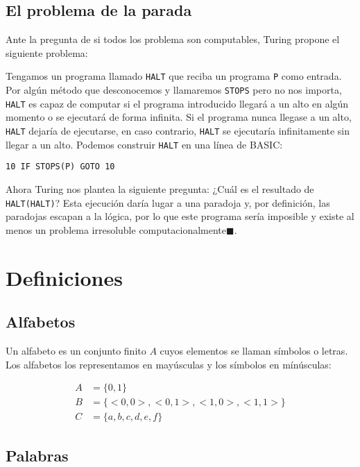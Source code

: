 \subsection{El problema de la parada}

Ante la pregunta de si todos los problema son computables, Turing propone el siguiente problema:

Tengamos un programa llamado \texttt{HALT} que reciba un programa \texttt{P} como entrada.
Por algún método que desconocemos y llamaremos \texttt{STOPS} pero no nos importa, \texttt{HALT} es capaz de computar si el programa introducido llegará a un alto en algún momento o se ejecutará de forma infinita.
Si el programa nunca llegase a un alto, \texttt{HALT} dejaría de ejecutarse, en caso contrario, \texttt{HALT} se ejecutaría infinitamente sin llegar a un alto.
Podemos construir \texttt{HALT} en una línea de BASIC\@:

\begin{lstlisting}[language={[Visual]Basic}]
10 IF STOPS(P) GOTO 10
\end{lstlisting}

Ahora Turing nos plantea la siguiente pregunta:
¿Cuál es el resultado de \texttt{HALT(HALT)}?
Esta ejecución daría lugar a una paradoja y, por definición, las paradojas escapan a la lógica, por lo que este programa sería imposible y existe al menos un problema irresoluble computacionalmente$\blacksquare$.

\section{Definiciones}

\subsection{Alfabetos}

Un alfabeto es un conjunto finito $A$ cuyos elementos se llaman símbolos o letras.
Los alfabetos los representamos en mayúsculas y los símbolos en mínúsculas:

\begin{align*}
	A &= \{0,1\} \\
	B &= \{<0,0>,<0,1>,<1,0>,<1,1>\} \\
	C &= \{a,b,c,d,e,f\}
\end{align*}

\subsection{Palabras}

